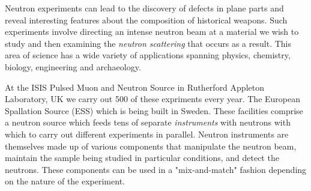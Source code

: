 Neutron experiments can lead to the discovery of defects in plane parts and reveal interesting features about the composition of historical weapons. Such experiments involve directing an intense neutron beam at a material we wish to study and then examining the \textit{neutron scattering} that occurs as a result. This area of science has a wide variety of applications spanning physics, chemistry, biology, engineering and archaeology.

At the ISIS Pulsed Muon and Neutron Source in Rutherford Appleton Laboratory, UK we carry out 500 of these expriments every year. The European Spallation Source (ESS) which is being built in Sweden. These facilities comprise a neutron source which feeds tens of separate \textit{instruments} with neutrons with which to carry out different experiments in parallel. Neutron instruments are themselves made up of various components that manipulate the neutron beam, maintain the sample being studied in particular conditions, and detect the neutrons. These components can be used in a "mix-and-match" fashion depending on the nature of the experiment.

\iffalse
As different researchers will have different things they wish to investigate, the components that are used in an experiment and the way in which they're used will vary from experiment to experiment in a ``mix-and-match" fashion.

In order to analyse the results of neutron experiments reliably we need a record of the \textit{experiment configuration}. This means an accurate description of the detected neutrons and conditions of the sample, but also the precise geometry of the components in the neutron instrument which was used. This information is stored in NeXus files. The \textit{NeXus Constructor} is an application under development to allow scientists to define the instrument geometry and precisely what data should be recorded during an experiment.
\fi

